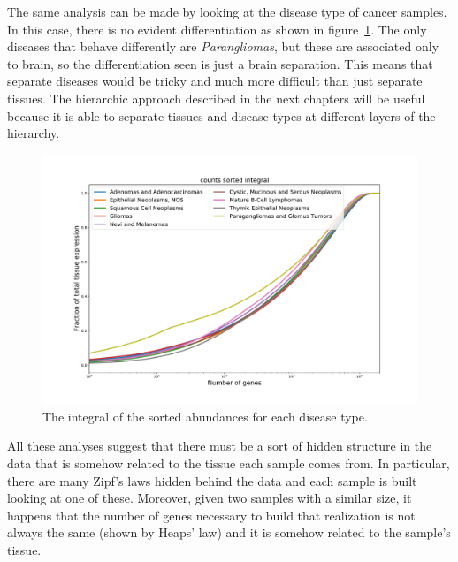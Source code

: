 The same analysis can be made by looking at the disease type of cancer samples. In this case, there is no evident differentiation as shown in figure~\ref{fig:structure/tcga/fraction_of_trascriptome_disease}. The only diseases that behave differently are \textit{Parangliomas}, but these are associated only to brain, so the differentiation seen is just a brain separation. This means that separate diseases would be tricky and much more difficult than just separate tissues. The hierarchic approach described in the next chapters will be useful because it is able to separate tissues and disease types at different layers of the hierarchy.
\begin{figure}[htb!]
  \centering
  \includegraphics[width=0.8\linewidth]{pictures/structure/tcga/fraction_of_trascriptome_disease.pdf}
  \caption{The integral of the sorted abundances for each disease type.}
  \label{fig:structure/tcga/fraction_of_trascriptome_disease}
\end{figure}

\FloatBarrier
All these analyses suggest that there must be a sort of hidden structure in the data that is somehow related to the tissue each sample comes from. In particular, there are many Zipf's laws hidden behind the data and each sample is built looking at one of these. Moreover, given two samples with a similar size, it happens that the number of genes necessary to build that realization is not always the same (shown by Heaps' law) and it is somehow related to the sample's tissue.